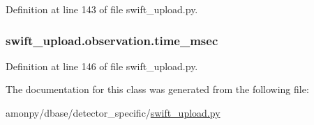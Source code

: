 Definition at line 143 of file swift\-\_\-upload.\-py.

\hypertarget{classswift__upload_1_1observation_a486373332832fa180cbcc1548b6365a6}{
\subsubsection[{time\-\_\-msec}]{\setlength{\rightskip}{0pt plus 5cm}swift\-\_\-upload.\-observation.\-time\-\_\-msec}}\label{classswift__upload_1_1observation_a486373332832fa180cbcc1548b6365a6}


Definition at line 146 of file swift\-\_\-upload.\-py.



The documentation for this class was generated from the following file\-:\begin{DoxyCompactItemize}
\item 
amonpy/dbase/detector\-\_\-specific/\hyperlink{swift__upload_8py}{swift\-\_\-upload.\-py}\end{DoxyCompactItemize}
